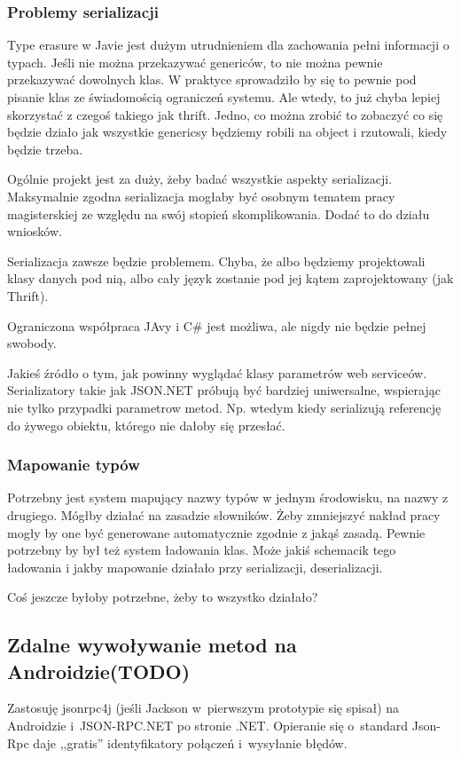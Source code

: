 \subsubsection{Problemy serializacji}
Type erasure w Javie jest dużym utrudnieniem dla zachowania pełni informacji o typach.
Jeśli nie można przekazywać genericów, to nie można pewnie przekazywać dowolnych klas. W praktyce sprowadziło by się to pewnie pod pisanie klas ze świadomością ograniczeń systemu. Ale wtedy, to już chyba lepiej skorzystać z czegoś takiego jak thrift.
Jedno, co można zrobić to zobaczyć co się będzie działo jak wszystkie genericsy będziemy robili na object i rzutowali, kiedy będzie trzeba.

Ogólnie projekt jest za duży, żeby badać wszystkie aspekty serializacji. Maksymalnie zgodna serializacja mogłaby być osobnym tematem pracy magisterskiej ze względu na swój stopień skomplikowania.
Dodać to do działu wniosków.

Serializacja zawsze będzie problemem. Chyba, że albo będziemy projektowali klasy danych pod nią, albo cały język zostanie pod jej kątem zaprojektowany (jak Thrift).

Ograniczona współpraca JAvy i C\# jest możliwa, ale nigdy nie będzie pełnej swobody.

Jakieś źródło o tym, jak powinny wyglądać klasy parametrów web serviceów.
Serializatory takie jak JSON.NET próbują być bardziej uniwersalne, wspierając nie tylko przypadki parametrow metod. Np. wtedym kiedy serializują referencję do żywego obiektu, którego nie dałoby się przesłać.

\subsubsection{Mapowanie typów}
Potrzebny jest system mapujący nazwy typów w jednym środowisku, na nazwy z drugiego. Mógłby działać na zasadzie słowników. Żeby zmniejszyć nakład pracy mogły by one być generowane automatycznie zgodnie z jakąś zasadą.
Pewnie potrzebny by był też system ładowania klas.
Może jakiś schemacik tego ładowania i jakby mapowanie działało przy serializacji, deserializacji.

Coś jeszcze byłoby potrzebne, żeby to wszystko działało?


\subsection{Zdalne wywoływanie metod na Androidzie(TODO)}
Zastosuję jsonrpc4j (jeśli Jackson w~pierwszym prototypie się spisał) na Androidzie i~JSON-RPC.NET po stronie .NET\@.
Opieranie się o~standard Json-Rpc daje ,,gratis'' identyfikatory połączeń i~wysyłanie błędów.

